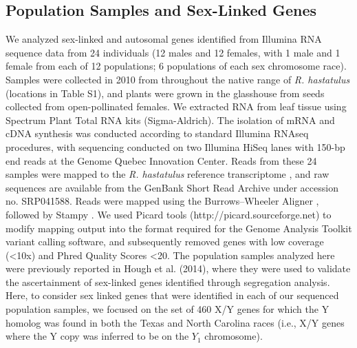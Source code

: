 \documentclass[9pt,twocolumn,twoside]{gsajnl}
\begin{document}
\subsection*{Population Samples and Sex-Linked Genes}
We analyzed sex-linked and autosomal genes identified from Illumina RNA sequence data from 24 individuals (12 males and 12 females, with 1 male and 1 female from each of 12 populations; 6 populations of each sex chromosome race). Samples were collected in 2010 from throughout the native range of \textit{R. hastatulus} (locations in Table S1), and plants were grown in the glasshouse from seeds collected from open-pollinated females. We extracted RNA from leaf tissue using Spectrum Plant Total RNA kits (Sigma-Aldrich). The isolation of mRNA and cDNA synthesis was conducted according to standard Illumina RNAseq procedures, with sequencing conducted on two Illumina HiSeq lanes with 150-bp end reads at the Genome Quebec Innovation Center. Reads from these 24 samples were mapped to the \textit{R. hastatulus} reference transcriptome \citep{hough2014}, and raw sequences are available from the GenBank Short Read Archive under accession no. SRP041588. Reads were mapped using the Burrows–Wheeler Aligner \citep{li2010fast}, followed by Stampy \citep{lunter2011stampy}. We used Picard tools (http://picard.sourceforge.net) to modify mapping output into the format required for the Genome Analysis Toolkit \citep{mckenna2010genome} variant calling software, and subsequently removed genes with low coverage (<10x) and Phred Quality Scores <20. The population samples analyzed here were previously reported in Hough et al. (2014), where they were used to validate the ascertainment of sex-linked genes identified through segregation analysis. Here, to consider sex linked genes that were identified in each of our sequenced population samples, we focused on the set of 460 X/Y genes for which the Y homolog was found in both the Texas and North Carolina races (i.e., X/Y genes where the Y copy was inferred to be on the $Y_{1}$ chromosome).
\end{document}
